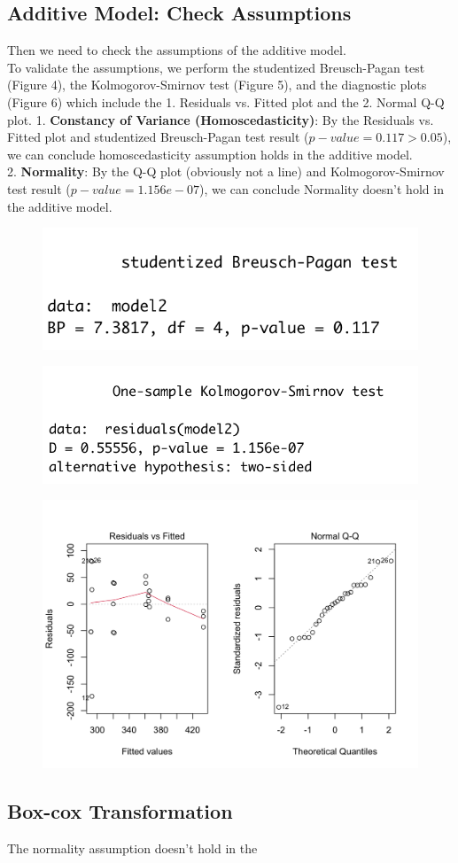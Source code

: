 \documentclass[11pt,a4paper]{article}
\begin{document}
\subsection{Additive Model: Check Assumptions}
Then we need to check the assumptions of the additive model.\\
To validate the assumptions, we perform the studentized Breusch-Pagan test (Figure 4), the Kolmogorov-Smirnov test (Figure 5), and the diagnostic plots (Figure 6) which include the 1. Residuals vs. Fitted plot and the 2. Normal Q-Q plot.
1. \textbf{Constancy of Variance (Homoscedasticity)}: By the Residuals vs. Fitted plot and studentized Breusch-Pagan test result ($p-value=0.117>0.05$), we can conclude homoscedasticity assumption holds in the additive model.\\
2. \textbf{Normality}: By the Q-Q plot (obviously not a line) and Kolmogorov-Smirnov test result ($p-value=1.156e-07$), we can conclude Normality doesn't hold in the additive model.
\begin{figure}[htb]
    \centering
    \includegraphics[scale=1]{BP1}
    \caption{}
    \label{}
\end{figure}
\begin{figure}[htb]
    \centering
    \includegraphics[scale=1]{KS1}
    \caption{}
    \label{}
\end{figure}
\begin{figure}[htb]
    \centering
    \includegraphics[scale=0.3]{DP1}
    \caption{}
    \label{}
\end{figure}

\subsection{Box-cox Transformation}
The normality assumption doesn't hold in the 
\end{document}
